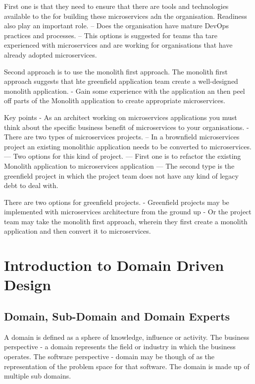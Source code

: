 \documentclass[a4paper, 11pt]{book}
\begin{document}
    First one is that they need to ensure that there are tools and technologies available to the for building these microservices adn the organisation.
    Readiness also play an important role.
    -- Does the organisation have mature DevOps practices and processes.
    -- This options is suggested for teams tha tare experienced with microservices and are working for organisations that have already adopted microservices.

    Second approach is to use the monolith first approach.
    The monolith first approach suggests that hte greenfield application team create a well-designed monolith application.
    - Gain some experience with the application an then peel off parts of the Monolith application to create appropriate microservices.

    Key points
    - As an architect working on microservices applications you must think about the specific business benefit of microservices to your organisations.
    - There are two types of microservices projects.
    -- In a brownfield microservices project an existing monolithic application needs to be converted to microservices.
    --- Two options for this kind of project.
    --- First one is to refactor the existing Monolith application to microservices application
    --- The second type is the greenfield project in which the project team does not have any kind of legacy debt to deal with.

    There are two options for greenfield projects.
    - Greenfield projects may be implemented with microservices architecture from the ground up
    - Or the project team may take the monolith first approach, wherein they first create a monolith application and then convert it to microservices.


    \chapter{Introduction to Domain Driven Design}


    \section{Domain, Sub-Domain and Domain Experts}
    A domain is defined as a sphere of knowledge, influence or activity.
    The business perspective - a domain represents the field or industry in which the business operates.
    The software perspective - domain may be though of as the representation of the problem space for that software. The domain is made up of multiple sub domains.
\end{document}

